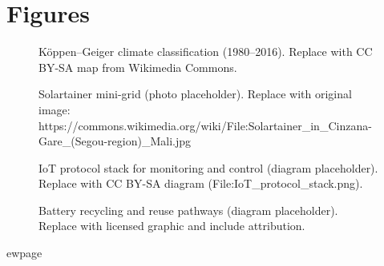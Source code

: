 \documentclass[12pt, a4paper]{article}
\begin{document}
\section*{Figures}

\begin{figure}[H]
\centering
{}
\caption{K\"oppen--Geiger climate classification (1980--2016). Replace with CC BY-SA map from Wikimedia Commons.}
\label{fig:koppen}
\end{figure}

\begin{figure}[H]
\centering
{}
\caption{Solartainer mini-grid (photo placeholder). Replace with original image: https://commons.wikimedia.org/wiki/File:Solartainer_in_Cinzana-Gare_(Segou-region)_Mali.jpg}
\label{fig:solartainer}
\end{figure}

\begin{figure}[H]
\centering
{}
\caption{IoT protocol stack for monitoring and control (diagram placeholder). Replace with CC BY-SA diagram (File:IoT_protocol_stack.png).}
\label{fig:iotstack}
\end{figure}

\begin{figure}[H]
\centering
{}
\caption{Battery recycling and reuse pathways (diagram placeholder). Replace with licensed graphic and include attribution.}
\label{fig:battery_recycling}
\end{figure}


ewpage
\end{document}
